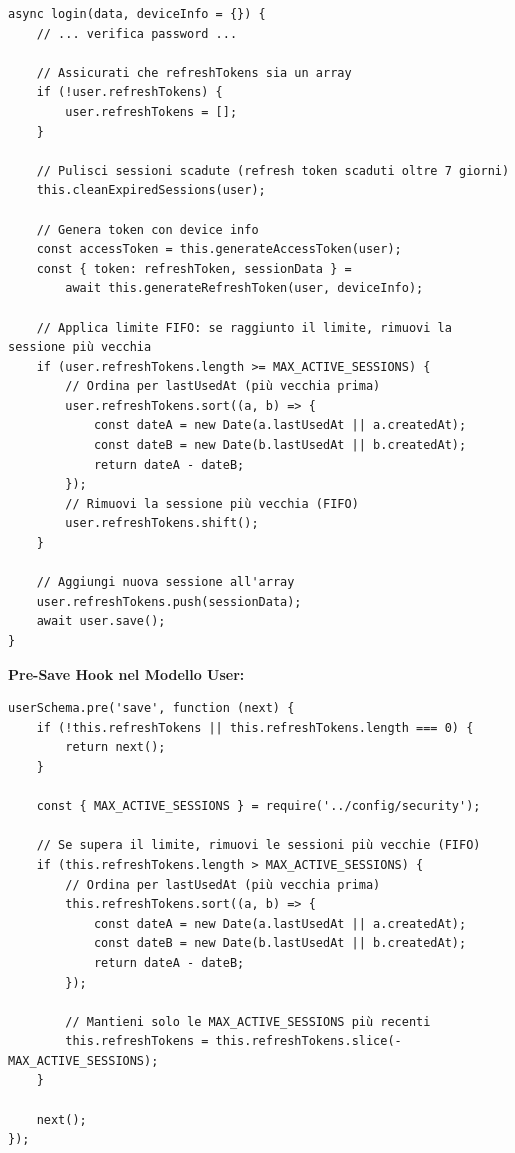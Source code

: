 \documentclass[11pt,a4paper]{article}
\begin{document}
\begin{lstlisting}[caption=Login con Limite FIFO]
async login(data, deviceInfo = {}) {
    // ... verifica password ...
    
    // Assicurati che refreshTokens sia un array
    if (!user.refreshTokens) {
        user.refreshTokens = [];
    }

    // Pulisci sessioni scadute (refresh token scaduti oltre 7 giorni)
    this.cleanExpiredSessions(user);

    // Genera token con device info
    const accessToken = this.generateAccessToken(user);
    const { token: refreshToken, sessionData } = 
        await this.generateRefreshToken(user, deviceInfo);

    // Applica limite FIFO: se raggiunto il limite, rimuovi la sessione più vecchia
    if (user.refreshTokens.length >= MAX_ACTIVE_SESSIONS) {
        // Ordina per lastUsedAt (più vecchia prima)
        user.refreshTokens.sort((a, b) => {
            const dateA = new Date(a.lastUsedAt || a.createdAt);
            const dateB = new Date(b.lastUsedAt || b.createdAt);
            return dateA - dateB;
        });
        // Rimuovi la sessione più vecchia (FIFO)
        user.refreshTokens.shift();
    }

    // Aggiungi nuova sessione all'array
    user.refreshTokens.push(sessionData);
    await user.save();
}
\end{lstlisting}

\textbf{Pre-Save Hook nel Modello User:}

\begin{lstlisting}[caption=Pre-Save Hook per Garantire Limite]
userSchema.pre('save', function (next) {
    if (!this.refreshTokens || this.refreshTokens.length === 0) {
        return next();
    }

    const { MAX_ACTIVE_SESSIONS } = require('../config/security');
    
    // Se supera il limite, rimuovi le sessioni più vecchie (FIFO)
    if (this.refreshTokens.length > MAX_ACTIVE_SESSIONS) {
        // Ordina per lastUsedAt (più vecchia prima)
        this.refreshTokens.sort((a, b) => {
            const dateA = new Date(a.lastUsedAt || a.createdAt);
            const dateB = new Date(b.lastUsedAt || b.createdAt);
            return dateA - dateB;
        });
        
        // Mantieni solo le MAX_ACTIVE_SESSIONS più recenti
        this.refreshTokens = this.refreshTokens.slice(-MAX_ACTIVE_SESSIONS);
    }

    next();
});
\end{lstlisting}
\end{document}
